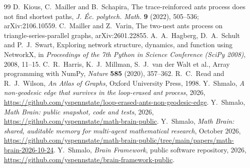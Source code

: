\documentclass[11pt]{amsart}
\theoremstyle{remark}
\begin{document}
\begin{thebibliography}{99}
 D.~Kious, C.~Mailler and B.~Schapira, The trace-reinforced ants process does not find shortest paths,
\emph{J. \'Ec. polytech. Math.} \textbf{9} (2022), 505--536; arXiv:2106.10559.
 C.~Mailler and Z.~Varin, The two-nest ants process on triangle-series-parallel graphs,
arXiv:2601.22855.
 A.~A.~Hagberg, D.~A.~Schult and P.~J.~Swart, Exploring network structure, dynamics, and function
using NetworkX, in \emph{Proceedings of the 7th Python in Science Conference (SciPy 2008)}, 2008, 11--15.
 C.~R.~Harris, K.~J.~Millman, S.~J.~van der Walt et al., Array programming with NumPy,
\emph{Nature} \textbf{585} (2020), 357--362.
 R.~C.~Read and R.~J.~Wilson, \emph{An Atlas of Graphs}, Oxford University Press, 1998.
 Y.~Shmalo, \emph{A non-geodesic edge that survives in the loop-erased ant process}, 2026,
\url{https://github.com/yspennstate/loop-erased-ants-non-geodesic-edge}.
 Y.~Shmalo, \emph{Math Brain: public snapshot, code and tests}, 2026,
\url{https://github.com/yspennstate/math-brain-public}.
 Y.~Shmalo, \emph{Math Brain: shared, auditable memory for multi-agent mathematical research},
October 2026, \url{https://github.com/yspennstate/math-brain-public/tree/main/papers/math-brain-2026-10-24}.
 Y.~Shmalo, \emph{Brain Framework}, public software repository, 2026,
\url{https://github.com/yspennstate/brain-framework-public}.
\end{thebibliography}
\end{document}
